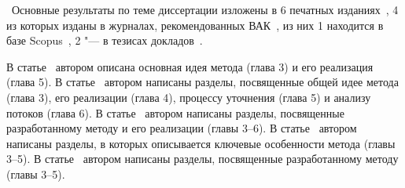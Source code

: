 
\publications\ Основные результаты по теме диссертации изложены в 6 печатных изданиях~\cite{lockatorVAK,lockatorVAK2,TMPA2017,theoryVAK,lockatorSyrcose,lockatorTMPA}, 
    4 из которых изданы в журналах, рекомендованных ВАК~\cite{lockatorVAK,lockatorVAK2,TMPA2017,theoryVAK}, из них 1 находится в базе Scopus~\cite{TMPA2017},
    2 "--- в тезисах докладов~\cite{lockatorSyrcose,lockatorTMPA}.

В статье~\cite{lockatorVAK} автором описана основная идея метода (глава 3) и его реализация (глава 5).
В статье~\cite{lockatorVAK2} автором написаны разделы, посвященные общей идее метода (глава 3), его реализации (глава 4), процессу уточнения (глава 5) и анализу потоков (глава 6).
В статье~\cite{TMPA2017} автором написаны разделы, посвященные разработанному методу и его реализации (главы 3--6).
В статье~\cite{lockatorSyrcose} автором написаны разделы, в которых описывается ключевые особенности метода (главы 3--5).
В статье~\cite{lockatorTMPA} автором написаны разделы, посвященные разработанному методу (главы 3--5).


